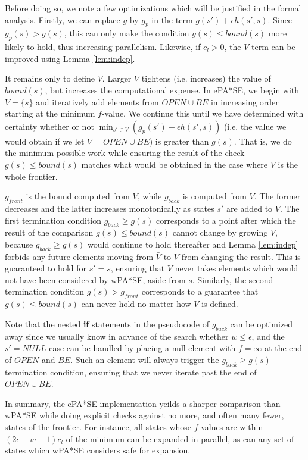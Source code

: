 \documentclass[letterpaper]{article}
\begin{document}
Before doing so, we note a few optimizations which will be justified in the formal analysis. Firstly, we can replace $g$ by $g_p$ in the term $g(s') + \epsilon h(s',s)$. Since $g_p(s) > g(s)$, this can only make the condition $g(s) \le bound(s)$ more likely to hold, thus increasing parallelism. Likewise, if $c_l > 0$, the $\bar V$ term can be improved using Lemma \ref{lem:indep}.

It remains only to define $V$. Larger $V$ tightens (i.e. increases) the value of $bound(s)$, but increases the computational expense. In ePA*SE, we begin with $V = \{s\}$ and iteratively add elements from $OPEN\cup BE$ in increasing order starting at the minimum $f$-value. We continue this until we have determined with certainty whether or not $\min_{s'\in V}\left(g_p(s') + \epsilon h(s',s)\right)$ (i.e. the value we would obtain if we let $V = OPEN\cup BE$) is greater than $g(s)$. That is, we do the minimum possible work while ensuring the result of the check $g(s) \le bound(s)$ matches what would be obtained in the case where $V$ is the whole frontier.

$g_{front}$ is the bound computed from $V$, while $g_{back}$ is computed from $\bar V$. The former decreases and the latter increases monotonically as states $s'$ are added to $V$. The first termination condition $g_{back} \ge g(s)$ corresponds to a point after which the result of the comparison $g(s) \le bound(s)$ cannot change by growing $V$, because $g_{back} \ge g(s)$ would continue to hold thereafter and Lemma \ref{lem:indep} forbids any future elements moving from $\bar V$ to $V$ from changing the result. This is guaranteed to hold for $s' = s$, ensuring that $V$ never takes elements which would not have been considered by wPA*SE, aside from $s$. Similarly, the second termination condition $g(s) > g_{front}$ corresponds to a guarantee that $g(s) \le bound(s)$ can never hold no matter how $V$ is defined.

Note that the nested \textbf{if} statements in the pseudocode of $g_{back}$ can be optimized away since we usually know in advance of the search whether $w \le \epsilon$, and the $s' = NULL$ case can be handled by placing a null element with $f = \infty$ at the end of $OPEN$ and $BE$. Such an element will always trigger the $g_{back} \ge g(s)$ termination condition, ensuring that we never iterate past the end of $OPEN\cup BE$.

In summary, the ePA*SE implementation yeilds a sharper comparison than wPA*SE while doing explicit checks against no more, and often many fewer, states of the frontier. For instance, all states whose $f$-values are within $(2\epsilon-w-1)c_l$ of the minimum can be expanded in parallel, as can any set of states which wPA*SE considers safe for expansion.
\end{document}
